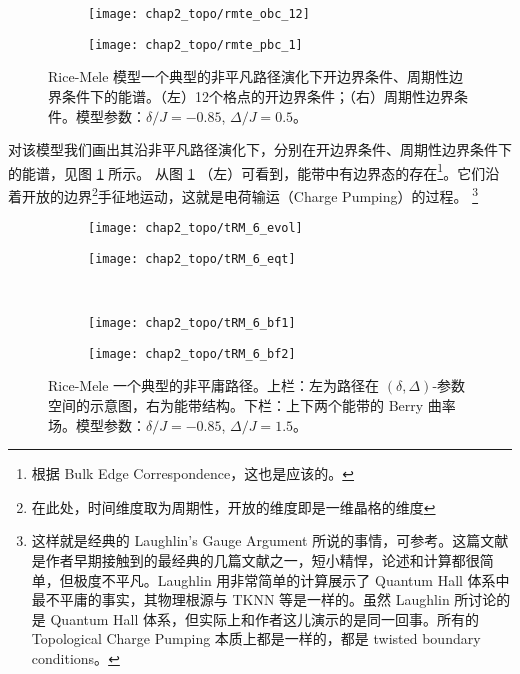 \begin{figure}[!htb]
\centering
\begin{subfigure}{.48\textwidth}
\texttt{[image: chap2\_topo/rmte\_obc\_12]}
\end{subfigure}
\begin{subfigure}{.48\textwidth}
\texttt{[image: chap2\_topo/rmte\_pbc\_1]}
\end{subfigure}
\caption{Rice-Mele 模型一个典型的非平凡路径演化下开边界条件、周期性边界条件下的能谱。（左）12个格点的开边界条件；（右）周期性边界条件。模型参数：$\delta/J=-0.85$, $\Delta/J=0.5$。}
\label{fig:rmterg}
\end{figure}
对该模型我们画出其沿非平凡路径演化下，分别在开边界条件、周期性边界条件下的能谱，见图 \ref{fig:rmterg} 所示。
从图 \ref{fig:rmterg} （左）可看到，能带中有边界态的存在\footnote{根据 Bulk Edge Correspondence，这也是应该的。}。它们沿着开放的边界\footnote{在此处，时间维度取为周期性，开放的维度即是一维晶格的维度}手征地运动，这就是电荷输运（Charge Pumping）的过程。
\footnote{这样就是经典的 Laughlin's Gauge Argument 所说的事情，可参考。这篇文献是作者早期接触到的最经典的几篇文献之一，短小精悍，论述和计算都很简单，但极度不平凡。Laughlin 用非常简单的计算展示了 Quantum Hall 体系中最不平庸的事实，其物理根源与 TKNN 等是一样的。虽然 Laughlin 所讨论的是 Quantum Hall 体系，但实际上和作者这儿演示的是同一回事。所有的 Topological Charge Pumping 本质上都是一样的，都是 twisted boundary conditions。}


\begin{figure}[!htb]
\centering
\begin{subfigure}{.4\textwidth}
\texttt{[image: chap2\_topo/tRM\_6\_evol]}
\end{subfigure}
\begin{subfigure}{.55\textwidth}
\texttt{[image: chap2\_topo/tRM\_6\_eqt]}
\end{subfigure}\\
\begin{subfigure}{.45\textwidth}
\texttt{[image: chap2\_topo/tRM\_6\_bf1]}
\end{subfigure}
\begin{subfigure}{.45\textwidth}
\texttt{[image: chap2\_topo/tRM\_6\_bf2]}
\end{subfigure}
\caption{Rice-Mele 一个典型的非平庸路径。上栏：左为路径在 $(\delta, \Delta)$-参数空间的示意图，右为能带结构。下栏：上下两个能带的 Berry 曲率场。模型参数：$\delta/J=-0.85$, $\Delta/J=1.5$。}
\label{fig:rmtberry}
\end{figure}

